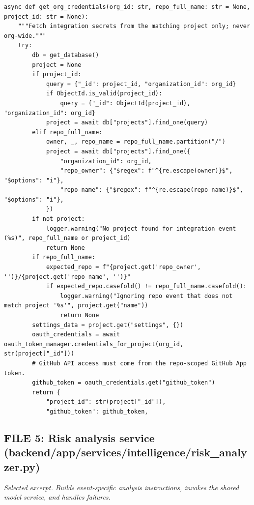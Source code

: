 \documentclass[11pt,a4paper]{article}
\begin{document}
{\begin{lstlisting}[style=python]
async def get_org_credentials(org_id: str, repo_full_name: str = None, project_id: str = None):
    """Fetch integration secrets from the matching project only; never org-wide."""
    try:
        db = get_database()
        project = None
        if project_id:
            query = {"_id": project_id, "organization_id": org_id}
            if ObjectId.is_valid(project_id):
                query = {"_id": ObjectId(project_id), "organization_id": org_id}
            project = await db["projects"].find_one(query)
        elif repo_full_name:
            owner, _, repo_name = repo_full_name.partition("/")
            project = await db["projects"].find_one({
                "organization_id": org_id,
                "repo_owner": {"$regex": f"^{re.escape(owner)}$", "$options": "i"},
                "repo_name": {"$regex": f"^{re.escape(repo_name)}$", "$options": "i"},
            })
        if not project:
            logger.warning("No project found for integration event (%s)", repo_full_name or project_id)
            return None
        if repo_full_name:
            expected_repo = f"{project.get('repo_owner', '')}/{project.get('repo_name', '')}"
            if expected_repo.casefold() != repo_full_name.casefold():
                logger.warning("Ignoring repo event that does not match project '%s'", project.get("name"))
                return None
        settings_data = project.get("settings", {})
        oauth_credentials = await oauth_token_manager.credentials_for_project(org_id, str(project["_id"]))
        # GitHub API access must come from the repo-scoped GitHub App token.
        github_token = oauth_credentials.get("github_token")
        return {
            "project_id": str(project["_id"]),
            "github_token": github_token,
\end{lstlisting}

\subsection{FILE 5: Risk analysis service\\(backend/app/services/intelligence/risk\_analyzer.py)}

\textit{Selected excerpt. Builds event-specific analysis instructions, invokes the shared model service, and handles failures.}

}
\end{document}
